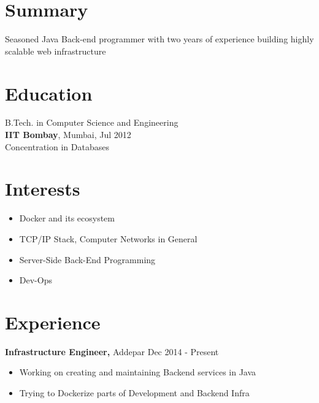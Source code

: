 \documentclass[margin]{res}
\begin{document}

\address{ \href{http://ankush.io/}{http://ankush.io} }
\address{ ankush@ankush.io }

\begin{resume}

\section{Summary}
  Seasoned Java Back-end programmer with two years of experience building highly scalable web infrastructure

\section{Education}
  B.Tech. in Computer Science and Engineering \\
  {\bf IIT Bombay}, Mumbai, Jul 2012 \\
  Concentration in Databases

\section{Interests}
 \begin{itemize} \itemsep -2pt  %
 \item Docker and its ecosystem
 \item TCP/IP Stack, Computer Networks in General
 \item Server-Side Back-End Programming
 \item Dev-Ops
 \end{itemize}

\section{Experience}
 {\bf Infrastructure Engineer,} Addepar \hfill Dec  2014  - Present
 \begin{itemize} \itemsep -2pt  %
 \item Working on creating and maintaining Backend services in Java
 \item Trying to Dockerize parts of Development and Backend Infra
 \end{itemize}


\end{resume}
\end{document}
